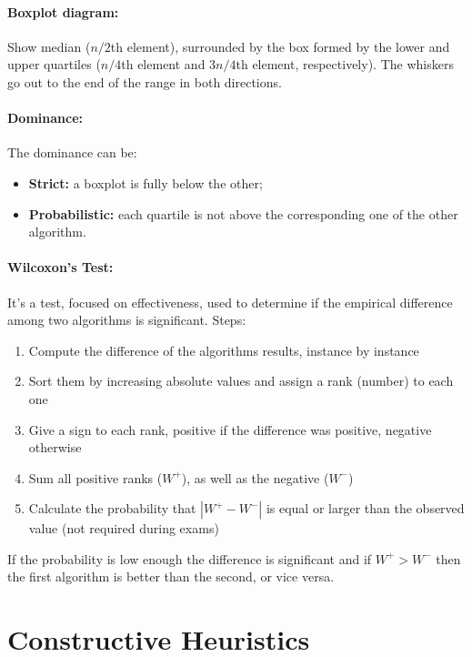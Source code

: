 \documentclass{article}
\begin{document}
	\paragraph{Boxplot diagram:} Show median ($n/2$th element), surrounded by the box formed by the lower and upper quartiles ($n/4$th element and $3n/4$th element, respectively). The whiskers go out to the end of the range in both directions.\\
	
	\paragraph{Dominance:} The dominance can be: 
	\begin{itemize}
		\item \textbf{Strict:} a boxplot is fully below the other;
		\item \textbf{Probabilistic:} each quartile is not above the corresponding one of the other algorithm.\\
	\end{itemize}
	
	\paragraph{Wilcoxon's Test:} It's a test, focused on effectiveness, used to determine if the empirical difference among two algorithms is significant. Steps:
	\begin{enumerate}
		\item Compute the difference of the algorithms results, instance by instance
		\item Sort them by increasing absolute values and assign a rank (number) to each one
		\item Give a sign to each rank, positive if the difference was positive, negative otherwise
		\item Sum all positive ranks ($W^+$), as well as the negative ($W^-$)
		\item Calculate the probability that $|W^+ - W^-|$ is equal or larger than the observed value (not required during exams)
	\end{enumerate}
	If the probability is low enough the difference is significant and if $W^+ > W^-$ then the first algorithm is better than the second, or vice versa.\\
	
	\section*{Constructive Heuristics}
	
\end{document}
